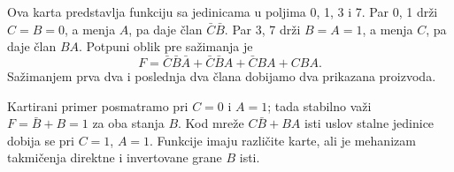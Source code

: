 
Ova karta predstavlja funkciju sa jedinicama u poljima 0, 1, 3 i 7. Par 0, 1 drži \(C=B=0\), a menja \(A\), pa daje član \(\bar C\bar B\). Par 3, 7 drži \(B=A=1\), a menja \(C\), pa daje član \(BA\). Potpuni oblik pre sažimanja je
\[
F=\bar C\bar B\bar A+\bar C\bar BA+\bar CBA+CBA.
\]
Sažimanjem prva dva i poslednja dva člana dobijamo dva prikazana proizvoda.

Kartirani primer posmatramo pri \(C=0\) i \(A=1\); tada stabilno važi \(F=\bar B+B=1\) za oba stanja \(B\). Kod mreže \(C\bar B+BA\) isti uslov stalne jedinice dobija se pri \(C=1\), \(A=1\). Funkcije imaju različite karte, ali je mehanizam takmičenja direktne i invertovane grane \(B\) isti.
